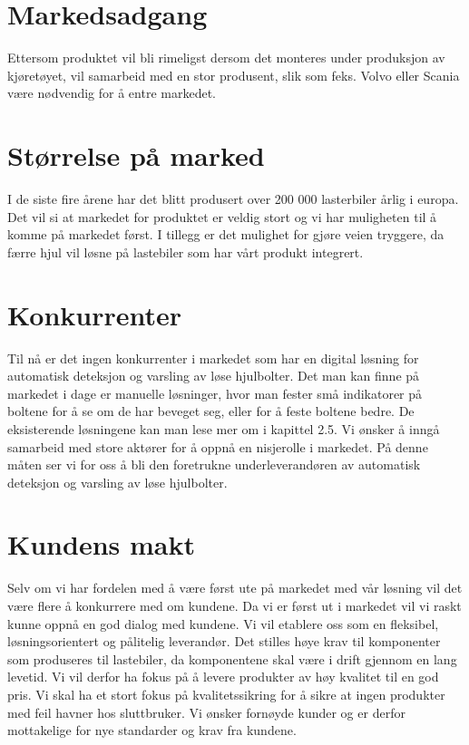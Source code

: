 \section{Markedsadgang}
Ettersom produktet vil bli rimeligst dersom det monteres under produksjon av kjøretøyet, vil  samarbeid med en stor produsent, slik som feks. Volvo eller Scania være nødvendig for å entre markedet. 
\section{Størrelse på marked}
I de siste fire årene har det blitt produsert over 200 000 lasterbiler årlig i europa\cite{lastebilprod-DAF}. Det vil si at markedet for produktet er veldig stort og vi har muligheten til å komme på markedet først. I tillegg er det mulighet for gjøre veien tryggere, da færre hjul vil løsne på lastebiler som har vårt produkt integrert.
\section{Konkurrenter}
Til nå er det ingen konkurrenter i markedet som har en digital løsning for automatisk deteksjon og varsling av løse hjulbolter. Det man kan finne på markedet i dage er manuelle løsninger, hvor man fester små indikatorer på boltene for å se om de har beveget seg, eller for å feste boltene bedre. De eksisterende løsningene kan man lese mer om i kapittel 2.5.
Vi ønsker å inngå samarbeid med store aktører for å oppnå en nisjerolle i markedet. På denne måten ser vi for oss å bli den foretrukne underleverandøren av automatisk deteksjon og varsling av løse hjulbolter.
\section{Kundens makt}
Selv om vi har fordelen med å være først ute på markedet med vår løsning vil det være flere å konkurrere med om kundene. Da vi er først ut i markedet vil vi raskt kunne oppnå en god dialog med kundene. Vi vil etablere oss som en fleksibel, løsningsorientert og pålitelig leverandør. Det stilles høye krav til komponenter som produseres til lastebiler, da komponentene skal være i drift gjennom en lang levetid. Vi vil derfor ha fokus på å levere produkter av høy kvalitet til en god pris. Vi skal ha et stort fokus på kvalitetssikring for å sikre at ingen produkter med feil havner hos sluttbruker. Vi ønsker fornøyde kunder og er derfor mottakelige for nye standarder og krav fra kundene. 
